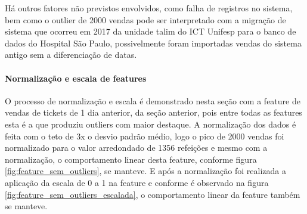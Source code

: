         	        Há outros fatores não previstos envolvidos, como falha de registros no sistema, bem como o outlier de 2000 vendas pode ser interpretado com a migração de sistema que ocorreu em 2017 da unidade talim do ICT Unifesp para o banco de dados do Hospital São Paulo, possivelmente foram importadas vendas do sistema antigo sem a diferenciação de datas.

                \paragraph*{Normalização e escala de features}
                    O processo de normalização e escala é demonstrado nesta seção com a feature de vendas de tickets de 1 dia anterior, da seção anterior, pois entre todas as features esta é a que produziu outliers com maior destaque.
                    A normalização dos dados é feita com o teto de 3x o desvio padrão médio, logo o pico de 2000 vendas foi normalizado para o valor arredondado de 1356 refeições e mesmo com a normalização, o comportamento linear desta feature, conforme figura \ref{fig:feature_sem_outliers}, se manteve.   
                    E após a normalização foi realizada a aplicação da escala de 0 a 1 na feature e conforme é observado na figura  \ref{fig:feature_sem_outliers_escalada}, o comportamento linear da feature também se manteve.

